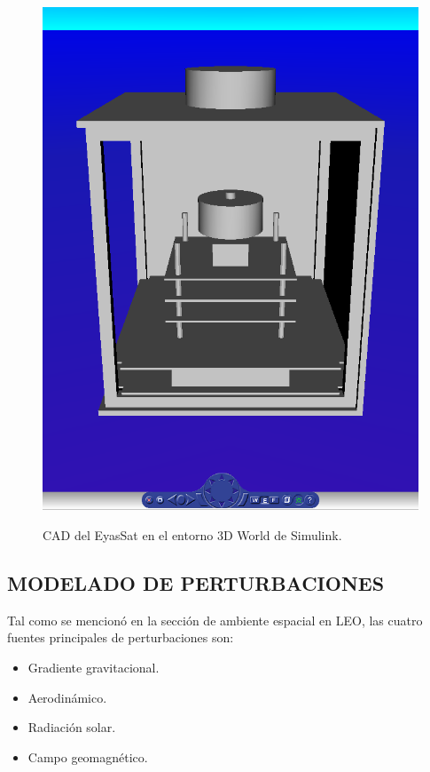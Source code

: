 \begin{figure}[h!]
	\begin{center}
		\includegraphics[scale=0.32]{imagenes/modelo_dinamico/escenario.PNG}\\
	\end{center}
	\caption{CAD del EyasSat en el entorno 3D World de Simulink.}
	\label{fig:escenario}
	\textit{}
\end{figure}
\newpage

\subsection{MODELADO DE PERTURBACIONES}

Tal como se mencionó en la sección de ambiente espacial en LEO, las cuatro fuentes principales de perturbaciones son: 
\begin{itemize}
	\item Gradiente gravitacional.
	\item Aerodinámico. 
	\item Radiación solar.
	\item Campo geomagnético.
\end{itemize}

